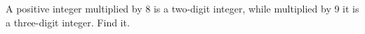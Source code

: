 A positive integer multiplied by 8 is a two-digit integer, while multiplied by 9 it is a three-digit integer. Find it.
